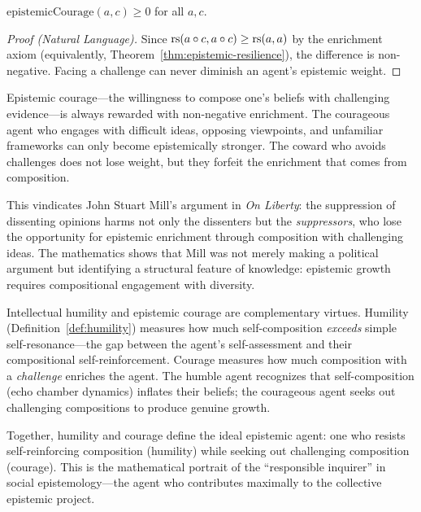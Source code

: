 \begin{theorem}
\label{thm:courage-nonneg}
$\mathrm{epistemicCourage}(a, c) \geq 0$ for all $a, c$.
\end{theorem}

\begin{proof}[Proof (Natural Language)]
Since $\mathrm{rs}(a \circ c, a \circ c) \geq \mathrm{rs}(a, a)$ by the enrichment axiom
(equivalently, Theorem~\ref{thm:epistemic-resilience}), the difference is
non-negative. Facing a challenge can never diminish an agent's epistemic weight.
\end{proof}

\begin{interpretation}
Epistemic courage---the willingness to compose one's beliefs with challenging
evidence---is always rewarded with non-negative enrichment. The courageous
agent who engages with difficult ideas, opposing viewpoints, and unfamiliar
frameworks can only become epistemically stronger. The coward who avoids
challenges does not lose weight, but they forfeit the enrichment that comes
from composition.

This vindicates John Stuart Mill's argument in \emph{On Liberty}: the
suppression of dissenting opinions harms not only the dissenters but the
\emph{suppressors}, who lose the opportunity for epistemic enrichment through
composition with challenging ideas. The mathematics shows that Mill was not
merely making a political argument but identifying a structural feature of
knowledge: epistemic growth requires compositional engagement with diversity.
\end{interpretation}

\begin{remark}
Intellectual humility and epistemic courage are complementary virtues.
Humility (Definition~\ref{def:humility}) measures how much self-composition
\emph{exceeds} simple self-resonance---the gap between the agent's self-assessment
and their compositional self-reinforcement. Courage measures how much
composition with a \emph{challenge} enriches the agent. The humble agent
recognizes that self-composition (echo chamber dynamics) inflates their beliefs;
the courageous agent seeks out challenging compositions to produce genuine growth.

Together, humility and courage define the ideal epistemic agent: one who
resists self-reinforcing composition (humility) while seeking out challenging
composition (courage). This is the mathematical portrait of the ``responsible
inquirer'' in social epistemology---the agent who contributes maximally to the
collective epistemic project.
\end{remark}


